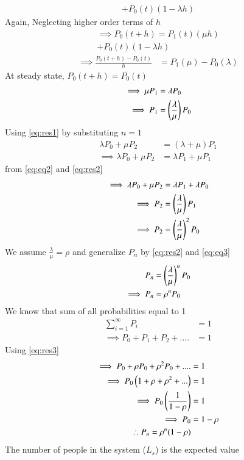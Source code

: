 \documentclass[journal,12pt,twocolumn]{IEEEtran}
\begin{document}
\begin{itemize}
\begin{multline}
    +P_0(t)(1-\lambda h)
\end{multline}
Again, Neglecting higher order terms of $h$
\begin{multline}
    \implies P_0(t+h)=P_1(t)(\mu h)\\
    +P_0(t)(1-\lambda h)
\end{multline}
\begin{align}
    \implies\frac{P_0(t+h)-P_0(t)}{h}&=P_1(\mu)-P_0(\lambda)
\end{align}
At steady state, $P_0(t+h)=P_0(t)$
\begin{align}
    \implies \mu P_1&=\lambda P_0\label{eq:eq2}\\
    \implies P_1&=\left(\frac{\lambda}{\mu}\right)P_0\label{eq:res2}
\end{align}
Using \eqref{eq:res1} by substituting $n=1$
\begin{align}
    \lambda P_0+\mu P_2&=(\lambda+\mu)P_1\\
    \implies \lambda P_0+\mu P_2&=\lambda P_1+\mu P_1
\end{align}
from \eqref{eq:eq2} and \eqref{eq:res2}
\begin{align}
    \implies\lambda P_0+\mu P_2&=\lambda P_1+\lambda P_0\\
    \implies P_2&=\left(\frac{\lambda}{\mu}\right)P_1\\
    \implies P_2&=\left(\frac{\lambda}{\mu}\right)^2P_0\label{eq:eq3}
\end{align}
We assume $\frac{\lambda}{\mu}=\rho$ and generalize $P_n$ by \eqref{eq:res2} and \eqref{eq:eq3}
\begin{align}
  P_n&=\left(\frac{\lambda}{\mu}\right)^nP_0\\
  \implies P_n&=\rho^nP_0\label{eq:res3}
\end{align}
We know that sum of all probabilities equal to 1
\begin{align}
    \sum_{i=1}^{\infty}P_i&=1\\
    \implies P_0+P_1+P_2+....&=1
\end{align}
Using \eqref{eq:res3}
\begin{align}
    \implies P_0+\rho P_0+\rho^2P_0+....&=1\\
    \implies P_0\left(1+\rho+\rho^2+...\right)&=1\\
    \implies P_0\left(\frac{1}{1-\rho}\right)&=1\\
    \implies P_0&=1-\rho\label{eq:res4}\\
    \therefore P_n=\rho^n(1-\rho)
\end{align}
The number of people in the system ($L_s$) is the expected value

\end{itemize}
\end{document}
